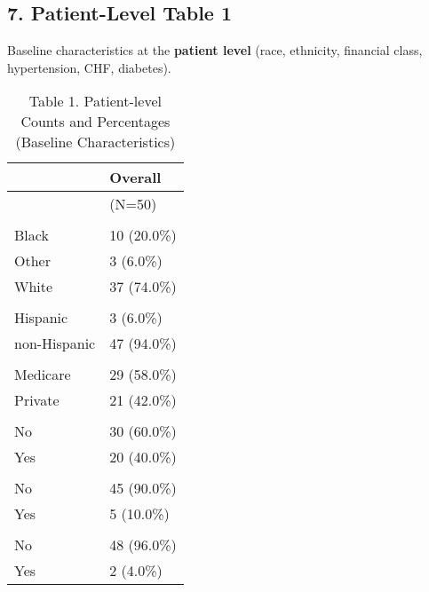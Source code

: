 \documentclass[
  letterpaper,
  DIV=11,
  numbers=noendperiod]{scrartcl}
\begin{document}
\subsection{7. Patient-Level Table 1}\label{patient-level-table-1}

Baseline characteristics at the \textbf{patient level} (race, ethnicity,
financial class, hypertension, CHF, diabetes).

\begin{table}

\caption{\label{tab:unnamed-chunk-9}Table 1. Patient-level Counts and Percentages (Baseline Characteristics)}
\centering
\begin{tabular}[t]{ll}
\toprule
  & Overall\\
\midrule
 & (N=50)\\
\addlinespace[0.3em]
\multicolumn{2}{l}{\textbf{race}}\\
\hspace{1em}Black & 10 (20.0\%)\\
\hspace{1em}Other & 3 (6.0\%)\\
\hspace{1em}White & 37 (74.0\%)\\
\addlinespace[0.3em]
\multicolumn{2}{l}{\textbf{ethnicity}}\\
\hspace{1em}Hispanic & 3 (6.0\%)\\
\hspace{1em}non-Hispanic & 47 (94.0\%)\\
\addlinespace[0.3em]
\multicolumn{2}{l}{\textbf{financialclass}}\\
\hspace{1em}Medicare & 29 (58.0\%)\\
\hspace{1em}Private & 21 (42.0\%)\\
\addlinespace[0.3em]
\multicolumn{2}{l}{\textbf{hypertension}}\\
\hspace{1em}No & 30 (60.0\%)\\
\hspace{1em}Yes & 20 (40.0\%)\\
\addlinespace[0.3em]
\multicolumn{2}{l}{\textbf{CHF}}\\
\hspace{1em}No & 45 (90.0\%)\\
\hspace{1em}Yes & 5 (10.0\%)\\
\addlinespace[0.3em]
\multicolumn{2}{l}{\textbf{diabetes}}\\
\hspace{1em}No & 48 (96.0\%)\\
\hspace{1em}Yes & 2 (4.0\%)\\
\bottomrule
\end{tabular}
\end{table}
\end{document}
